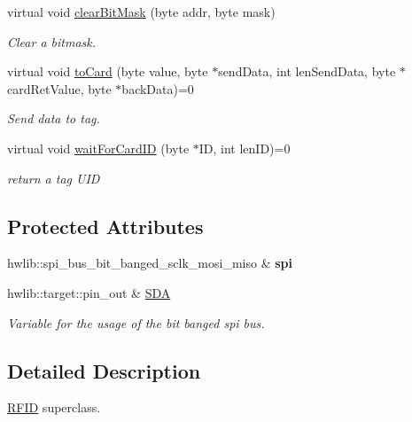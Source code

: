 \begin{DoxyCompactItemize}
virtual void \hyperlink{class_r_f_i_d_afa2560b026553dac1f6aa20d17f47438}{clear\+Bit\+Mask} (byte addr, byte mask)
\begin{DoxyCompactList}\small\item\em Clear a bitmask. \end{DoxyCompactList}\item 
virtual void \hyperlink{class_r_f_i_d_ad44955169cde018c9673ae5073fcac24}{to\+Card} (byte value, byte $\ast$send\+Data, int len\+Send\+Data, byte $\ast$card\+Ret\+Value, byte $\ast$back\+Data)=0
\begin{DoxyCompactList}\small\item\em Send data to tag. \end{DoxyCompactList}\item 
virtual void \hyperlink{class_r_f_i_d_a7e02863bc0f1f117b05d72f9063497f7}{wait\+For\+Card\+ID} (byte $\ast$ID, int len\+ID)=0
\begin{DoxyCompactList}\small\item\em return a tag U\+ID \end{DoxyCompactList}\end{DoxyCompactItemize}
\subsection*{Protected Attributes}
\begin{DoxyCompactItemize}
\item 
hwlib\+::spi\+\_\+bus\+\_\+bit\+\_\+banged\+\_\+sclk\+\_\+mosi\+\_\+miso \& {\bfseries spi}\hypertarget{class_r_f_i_d_ad2de95fbca075609eb41fa8d27d96077}{}\label{class_r_f_i_d_ad2de95fbca075609eb41fa8d27d96077}

\item 
hwlib\+::target\+::pin\+\_\+out \& \hyperlink{class_r_f_i_d_a4367d5ca78409b651a56920886e8fac2}{S\+DA}\hypertarget{class_r_f_i_d_a4367d5ca78409b651a56920886e8fac2}{}\label{class_r_f_i_d_a4367d5ca78409b651a56920886e8fac2}

\begin{DoxyCompactList}\small\item\em Variable for the usage of the bit banged spi bus. \end{DoxyCompactList}\end{DoxyCompactItemize}


\subsection{Detailed Description}
\hyperlink{class_r_f_i_d}{R\+F\+ID} superclass. 

